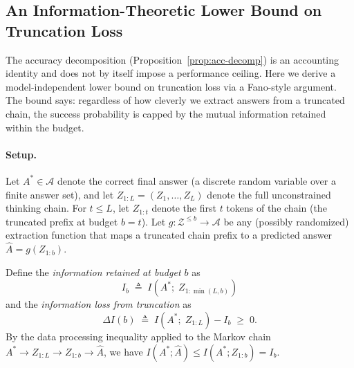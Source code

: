 
\subsection{An Information-Theoretic Lower Bound on Truncation Loss}
\label{sec:theory:info-bound}

The accuracy decomposition (Proposition~\ref{prop:acc-decomp}) is an accounting
identity and does not by itself impose a performance ceiling.
Here we derive a model-independent lower bound on truncation loss via a
Fano-style argument.
The bound says: regardless of how cleverly we extract answers from a
truncated chain, the success probability is capped by the mutual
information retained within the budget.

\paragraph{Setup.}
Let $A^* \in \mathcal{A}$ denote the correct final answer (a discrete
random variable over a finite answer set), and let
$Z_{1:L} = (Z_1, \dots, Z_L)$ denote the full unconstrained thinking
chain.
For $t \le L$, let $Z_{1:t}$ denote the first $t$ tokens of the chain
(the truncated prefix at budget $b=t$).
Let $g: \mathcal{Z}^{\le b} \to \mathcal{A}$ be any (possibly randomized)
extraction function that maps a truncated chain prefix to a predicted
answer $\hat{A} = g(Z_{1:b})$.

Define the \emph{information retained at budget $b$} as
\begin{equation}
  I_b \;\triangleq\; I(A^*;\; Z_{1:\min(L,b)})
  \label{eq:info-retained}
\end{equation}
and the \emph{information loss from truncation} as
\begin{equation}
  \Delta I(b) \;\triangleq\; I(A^*;\; Z_{1:L}) - I_b \;\ge\; 0.
  \label{eq:info-loss}
\end{equation}
By the data processing inequality applied to the Markov chain
$A^* \to Z_{1:L} \to Z_{1:b} \to \hat{A}$, we have
$I(A^*; \hat{A}) \le I(A^*; Z_{1:b}) = I_b$.

